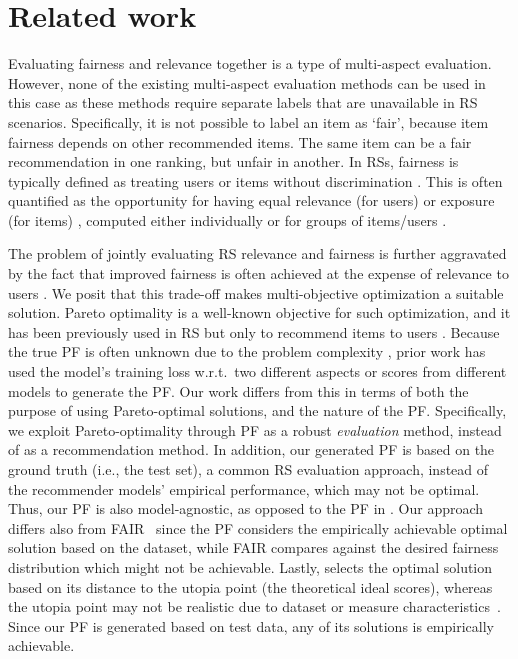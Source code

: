 \section{Related work}
\label{s:prev_work}

Evaluating fairness and relevance together is a type of multi-aspect evaluation. 
However, none of the existing multi-aspect evaluation methods \cite{Maistro2021PrincipledRankings, Lioma2017EvaluationLists,Palotti2018MM:Engines} can be used in this case as 
these methods require separate labels that are unavailable in RS scenarios. 
Specifically, it is not possible to label an item as `fair', because item fairness depends on other recommended items. The same item can be a fair recommendation in one ranking, but unfair in another. In RSs, fairness is typically defined as treating users or items without discrimination \cite{Biega2018EquityRankings}. This is often quantified as the opportunity for 
having equal relevance (for users) or exposure (for items) 
\cite{Biega2018EquityRankings, Wang2022ProvidingSystems}, computed either individually or for
groups of items/users \cite{Raj2022MeasuringResults, Zehlike2022FairnessSystemsc}. 

The problem of jointly evaluating RS relevance and fairness is further aggravated by the fact that improved fairness is often achieved at the expense of relevance to users \cite{Mehrotra2018TowardsSystems}. 
We posit that this trade-off makes multi-objective optimization a suitable solution. Pareto optimality is a well-known objective for such optimization, 
and it has been previously used in RS but only to recommend items to users \cite{Ribeiro2015MultiobjectiveSystems,  Zheng2022AOptimization, Ge2022TowardLearning, Xu2023P-MMF:System}. 
Because the true PF is often unknown due to the problem complexity \cite{Laszczyk2019SurveyMeasures,Audet2020PerformanceOptimization}, prior work has used the model's training loss w.r.t.~two different aspects \cite{Lin2019ARecommendation} or scores from different models \cite{Nia2022RethinkingNetworks,Paparella2023Post-hocRecommendation} to generate the PF. 
Our work differs from this in terms of both the purpose of using Pareto-optimal solutions, and the nature of the PF. Specifically, we exploit Pareto-optimality through PF as a robust \textit{evaluation} method, instead of as a recommendation method. 
In addition, our generated PF is based on the ground truth (i.e., the test set), a common RS evaluation approach, instead of the recommender models' empirical performance, which may not be optimal. Thus, our PF is also model-agnostic, as opposed to the PF in \cite{Xu2023P-MMF:System}. 
Our approach differs also from FAIR~\cite{Gao2022FAIR:Evaluation} since the PF considers the empirically achievable optimal solution based on the dataset, while FAIR compares against the desired fairness distribution which might not be achievable. Lastly, \cite{Paparella2023Post-hocRecommendation} selects the optimal solution based on its distance to the utopia point (the theoretical ideal scores), whereas the utopia point may not be realistic due to dataset or measure characteristics~\cite{Rampisela2024EvaluationStudy,Moffat2013SevenMetrics}. Since our PF is generated based on test data, any of its solutions is empirically achievable.